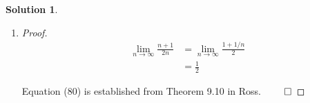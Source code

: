 \documentclass[12pt]{article}
\theoremstyle{definition} %
\newtheorem{solution}{Solution}
\theoremstyle{plain} %
\begin{document}
\begin{solution}
\begin{enumerate}
\begin{proof}
            Thus, the proof is complete.
        \end{proof}
        \item \begin{proof}
            \begin{align}
                \lim_{n \to \infty} \frac{n + 1}{2n} &= \lim_{n \to \infty} \frac{1 + 1/n}{2} \tag{80} \\
                &= \frac{1}{2} \tag{81}
            \end{align}
        
            Equation (80) is established from Theorem 9.10 in Ross. \(\qed\)
        \end{proof} 
    \end{enumerate}
\end{solution}
\end{document}
